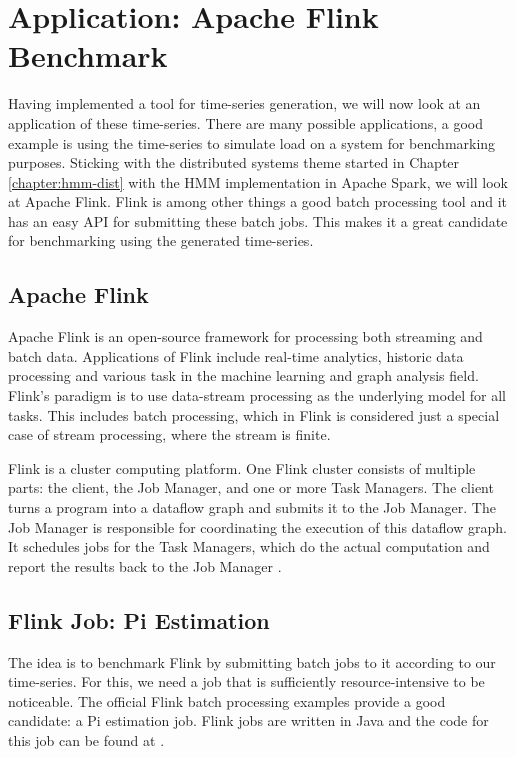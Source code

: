 \chapter{Application: Apache Flink Benchmark}\label{chapter:benchmark}

Having implemented a tool for time-series generation, we will now look at an application of these time-series. There are many possible applications, a good example is using the time-series to simulate load on a system for benchmarking purposes. Sticking with the distributed systems theme started in Chapter \ref{chapter:hmm-dist} with the HMM implementation in Apache Spark, we will look at Apache Flink. Flink is among other things a good batch processing tool and it has an easy API for submitting these batch jobs. This makes it a great candidate for benchmarking using the generated time-series. 

\section{Apache Flink}

Apache Flink is an open-source framework for processing both streaming and batch data. Applications of Flink include real-time analytics, historic data processing and various task in the machine learning and graph analysis field. Flink's paradigm is to use data-stream processing as the underlying model for all tasks. This includes batch processing, which in Flink is considered just a special case of stream processing, where the stream is finite. 

Flink is a cluster computing platform. One Flink cluster consists of multiple parts: the client, the Job Manager, and one or more Task Managers. The client turns a program into a dataflow graph and submits it to the Job Manager. The Job Manager is responsible for coordinating the execution of this dataflow graph. It schedules jobs for the Task Managers, which do the actual computation and report the results back to the Job Manager \parencite{carbone2015apache}.

\section{Flink Job: Pi Estimation}

The idea is to benchmark Flink by submitting batch jobs to it according to our time-series. For this, we need a job that is sufficiently resource-intensive to be noticeable. The official Flink batch processing examples provide a good candidate: a Pi estimation job. Flink jobs are written in Java and the code for this job can be found at \parencite{flinkpiestim}. 

